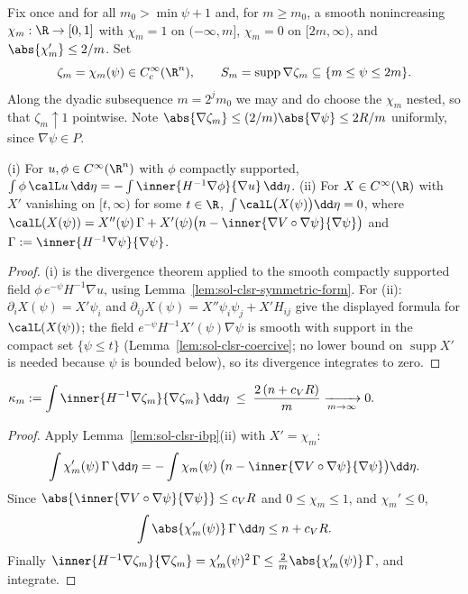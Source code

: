 \documentclass[../main.tex]{subfiles}
\begin{document}
Fix once and for all $m_0>\min\psi+1$ and, for $m\ge m_0$, a smooth nonincreasing
$\chi_m:\R\to[0,1]$ with $\chi_m=1$ on $(-\infty,m]$, $\chi_m=0$ on $[2m,\infty)$, and
$\abs{\chi_m'}\le2/m$.  Set
\[
  \zeta_m=\chi_m(\psi)\in C_c^\infty(\R^n),\qquad
  S_m=\operatorname{supp}\nabla\zeta_m\subseteq\{m\le\psi\le2m\} .
\]
Along the dyadic subsequence $m=2^jm_0$ we may and do choose the $\chi_m$ nested, so that
$\zeta_m\uparrow1$ pointwise.  Note $\abs{\nabla\zeta_m}\le(2/m)\abs{\nabla\psi}\le2R/m$
uniformly, since $\nabla\psi\in P$.

\begin{lemma}
\label{lem:sol-clsr-ibp}
(i) For $u,\phi\in C^\infty(\R^n)$ with $\phi$ compactly supported,
$\int\phi\,\calL u\,\dd\eta=-\int\inner{H^{-1}\nabla\phi}{\nabla u}\,\dd\eta$.
(ii) For $X\in C^\infty(\R)$ with $X'$ vanishing on $[t,\infty)$ for some $t\in\R$,
$\int\calL\bigl(X(\psi)\bigr)\dd\eta=0$, where
$\calL(X(\psi))=X''(\psi)\,\Gamma+X'(\psi)\bigl(n-\inner{\nabla V\circ\nabla\psi}{\nabla\psi}\bigr)$
and $\Gamma:=\inner{H^{-1}\nabla\psi}{\nabla\psi}$.
\end{lemma}

\begin{proof}
(i) is the divergence theorem applied to the smooth compactly supported field
$\phi\,e^{-\psi}H^{-1}\nabla u$, using Lemma~\ref{lem:sol-clsr-symmetric-form}.  For (ii):
$\partial_i X(\psi)=X'\psi_i$ and $\partial_{ij}X(\psi)=X''\psi_i\psi_j+X'H_{ij}$ give the
displayed formula for $\calL(X(\psi))$; the field
$e^{-\psi}H^{-1}X'(\psi)\nabla\psi$ is smooth with support in the compact set
$\{\psi\le t\}$ (Lemma~\ref{lem:sol-clsr-coercive}; no lower bound on
$\operatorname{supp}X'$ is needed because $\psi$ is bounded below), so its divergence
integrates to zero.
\end{proof}

\begin{lemma}
\label{lem:sol-clsr-cutoff}
$\displaystyle
  \kappa_m:=\int\inner{H^{-1}\nabla\zeta_m}{\nabla\zeta_m}\,\dd\eta
  \;\le\;\frac{2\,(n+c_VR)}{m}\xrightarrow[m\to\infty]{}0 .$
\end{lemma}

\begin{proof}
Apply Lemma~\ref{lem:sol-clsr-ibp}(ii) with $X'=\chi_m$:
\[
  \int\chi_m'(\psi)\,\Gamma\,\dd\eta
  =-\int\chi_m(\psi)\,\bigl(n-\inner{\nabla V\circ\nabla\psi}{\nabla\psi}\bigr)\dd\eta .
\]
Since $\abs{\inner{\nabla V\circ\nabla\psi}{\nabla\psi}}\le c_VR$ and $0\le\chi_m\le1$, and
$\chi_m'\le0$,
\[
  \int\abs{\chi_m'(\psi)}\,\Gamma\,\dd\eta\le n+c_VR .
\]
Finally $\inner{H^{-1}\nabla\zeta_m}{\nabla\zeta_m}=\chi_m'(\psi)^2\,\Gamma
\le\tfrac2m\abs{\chi_m'(\psi)}\,\Gamma$, and integrate.
\end{proof}
\end{document}
